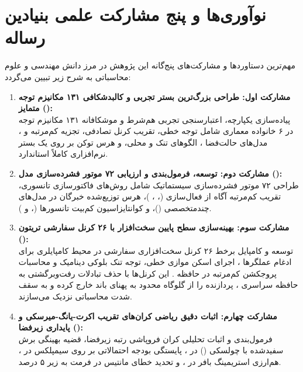 \documentclass[12pt,a4paper]{report}
\theoremstyle{definition}
\begin{document}
\section{نوآوری‌ها و پنج مشارکت علمی بنیادین رساله}
\label{sec:core_contributions}
مهم‌ترین دستاوردها و مشارکت‌های پنج‌گانه این پژوهش در مرز دانش مهندسی و علوم محاسباتی به شرح زیر تبیین می‌گردد:

\begin{enumerate}
    \item \textbf{مشارکت اول: طراحی بزرگ‌ترین بستر تجربی و کالبدشکافی ۱۳۱ مکانیزم توجه متمایز ():} \\
    پیاده‌سازی یکپارچه، اعتبارسنجی تجربی هم‌شرط و موشکافانه ۱۳۱ مکانیزم توجه در ۶ خانواده معماری شامل توجه خطی، تقریب کرنل تصادفی، تجزیه کم‌مرتبه و ، مدل‌های حالت‌فضا ، الگوهای تنک و محلی، و هرس توکن بر روی یک بستر نرم‌افزاری کاملاً استاندارد.

    \item \textbf{مشارکت دوم: توسعه، فرمول‌بندی و ارزیابی ۷۲ موتور فشرده‌سازی مدل ():} \\
    طراحی ۷۲ موتور فشرده‌سازی سیستماتیک شامل روش‌های فاکتورسازی تانسوری، تقریب کم‌مرتبه آگاه از فعال‌سازی (، ، )، هرس توزیع‌شده خبرگان در مدل‌های چندمتخصصی ()، و کوانتایزاسیون کم‌بیت تانسورها (،  و ).

    \item \textbf{مشارکت سوم: بهینه‌سازی سطح پایین سخت‌افزار با ۲۶ کرنل سفارشی تریتون ():} \\
    توسعه و کامپایل برخط ۲۶ کرنل سخت‌افزاری سفارشی در محیط کامپایلری  برای ادغام عملگرها ، اجرای اسکن موازی خطی، توجه تنک بلوکی دینامیک  و محاسبات پروجکشن کم‌مرتبه در حافظه . این کرنل‌ها با حذف تبادلات رفت‌وبرگشتی به حافظه سراسری ، پردازنده را از گلوگاه محدود به پهنای باند خارج کرده و به سقف شدت محاسباتی نزدیک می‌سازند.

    \item \textbf{مشارکت چهارم: اثبات دقیق ریاضی کران‌های تقریب اکرت-یانگ-میرسکی و پایداری زیرفضا ():} \\
    فرمول‌بندی و اثبات تحلیلی کران فروپاشی رتبه زیرفضا، قضیه بهینگی برش سفیدشده با چولسکی () در ، پایستگی بودجه احتمالاتی بر روی سیمپلکس در ، هم‌ارزی استریمینگ بافر  در ، و تحدید خطای مانتیس در فرمت  به زیر ۵ درصد.


\end{enumerate}
\end{document}
